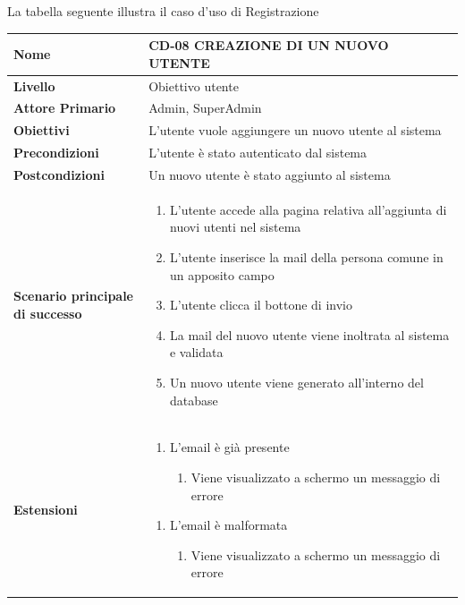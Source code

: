 La tabella seguente illustra il caso d'uso di Registrazione

\begin{center}
    \begin{tabular}{|p{0.3\linewidth}|p{0.7\linewidth}|}
    \hline
    \rowcolor{Blue}
    \textbf{Nome} & CD-08 CREAZIONE DI UN NUOVO UTENTE \\
    \hline
    \rowcolor{DarkBlue}
    \textbf{Livello} & Obiettivo utente \\
    \hline
    \rowcolor{LightBlue}
    \textbf{Attore Primario} & Admin, SuperAdmin \\
    \hline
    \rowcolor{LightBlue}
    \textbf{Obiettivi} & L’utente vuole aggiungere un nuovo utente al sistema \\
    \hline
    \rowcolor{Blue}
    \textbf{Precondizioni} & L’utente è stato autenticato dal sistema \\
    \hline
    \rowcolor{LightBlue}
    \textbf{Postcondizioni} & Un nuovo utente è stato aggiunto al sistema \\
    \hline
    \rowcolor{LighterBlue}
        \begin{center}
        \textbf{Scenario principale di successo}
    \end{center} 
    & 
    \begin{enumerate}
        \item L’utente accede alla pagina relativa all’aggiunta di nuovi utenti nel sistema
        \item L’utente inserisce la mail della persona comune in un apposito campo
        \item L’utente clicca il bottone di invio
        \item La mail del nuovo utente viene inoltrata al sistema e validata
        \item Un nuovo utente viene generato all’interno del database
    \end{enumerate}
    \\
    \hline
    \rowcolor{LighterBlue}
    \begin{center}
        \textbf{Estensioni}
    \end{center} 
    & 
    \begin{enumerate}
        \item L’email è già presente
        \begin{enumerate}
            \item Viene visualizzato a schermo un messaggio di errore
        \end{enumerate}
    \end{enumerate}
    \begin{enumerate}
        \item L’email è malformata
        \begin{enumerate}
            \item Viene visualizzato a schermo un messaggio di errore
        \end{enumerate}
    \end{enumerate}
    \\
    \hline
    \end{tabular}
\end{center}

